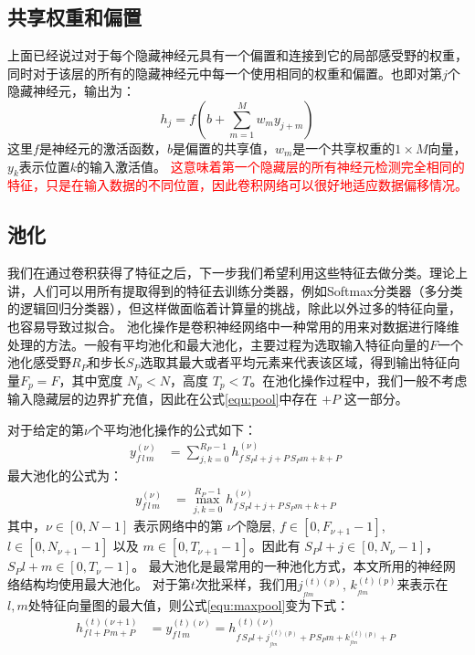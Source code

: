 \subsection{共享权重和偏置}
上面已经说过对于每个隐藏神经元具有一个偏置和连接到它的局部感受野的权重，同时对于该层的所有的隐藏神经元中每一个使用相同的权重和偏置。也即对第$j$个隐藏神经元，输出为：
\begin{equation}
  h_j = f(b+\sum_{m=1}^M w_m y_{j+m})
\end{equation}
这里$f$是神经元的激活函数，$b$是偏置的共享值，$w_m$是一个共享权重的$1\times M$向量，$y_k$表示位置$k$的输入激活值。
\textcolor{red}{这意味着第一个隐藏层的所有神经元检测完全相同的特征，只是在输入数据的不同位置，因此卷积网络可以很好地适应数据偏移情况。}

\subsection{池化}
我们在通过卷积获得了特征之后，下一步我们希望利用这些特征去做分类。理论上讲，人们可以用所有提取得到的特征去训练分类器，例如Softmax分类器（多分类的逻辑回归分类器），但这样做面临着计算量的挑战，除此以外过多的特征向量，也容易导致过拟合。
池化操作是卷积神经网络中一种常用的用来对数据进行降维处理的方法。一般有平均池化和最大池化，主要过程为选取输入特征向量的$F$一个池化感受野$R_P$和步长$S_P$选取其最大或者平均元素来代表该区域，得到输出特征向量$F_p=F$，其中宽度 $N_p<N$，高度 $T_p<T$。在池化操作过程中，我们一般不考虑输入隐藏层的边界扩充值，因此在公式\ref{equ:pool}中存在 $+P$ 这一部分。

对于给定的第$\nu$个平均池化操作的公式如下：
\begin{align}
y_{f\,l\,m}^{(\nu)}&=\sum^{R_P-1}_{j,k=0} h_{f\,S_P l+j+P\,S_Pm+k+P}^{(\nu)}\;
\label{equ:pool}
\end{align}
最大池化的公式为：
\begin{align}
y_{f\,l\,m}^{(\nu)}&=\max^{R_P-1}_{j,k=0} h_{f\,S_P l+j+P\,S_Pm+k+P}^{(\nu)}\;
\label{equ:maxpool}
\end{align}
其中，$\nu \in [0,N-1 ]$ 表示网络中的第 $\nu$个隐层, $f\in[0,F_{\nu+1}-1]$, $l\in[0,N_{\nu+1}-1 ]$ 以及 $m\in[0,T_{\nu+1}-1 ]$。因此有 $S_Pl+j\in[0,N_\nu-1 ]$， $S_Pl+m\in[0,T_\nu-1 ]$。
最大池化是最常用的一种池化方式，本文所用的神经网络结构均使用最大池化。
对于第$t$次批采样，我们用$j^{(t)(p)}_{_{flm}},\,k^{(t)(p)}_{_{flm}}$来表示在 $l,m$处特征向量图的最大值，则公式\ref{equ:maxpool}变为下式：
\begin{align}
h_{f\,l+P\,m+P}^{(t)(\nu+1)}&=y_{f\,l\,m}^{(t)(\nu)}=
%
h^{(t)(\nu)}_{f\,S_P l+j^{(t)(p)}_{_{flm}}+P\,S_Pm+k^{(t)(p)}_{_{flm}}+P}\;
\end{align}

